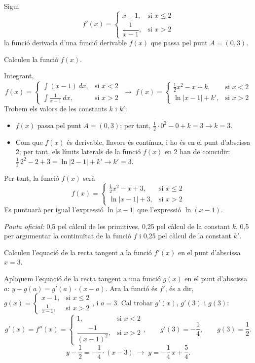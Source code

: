 Sigui
\[
f'(x)=\begin{cases}x-1,&\text{si }x\le2\\[3pt]\dfrac{1}{x-1},&\text{si }x>2\end{cases}
\]
la funció derivada d'una funció derivable $f(x)$ que passa pel punt $A=(0,3)$.

\begin{apartats}

Calculeu la funció $f(x)$.

\begin{solucio}
Integrant,
\[
f(x)=\begin{cases}\int(x-1)\,dx,&\text{si }x<2\\[3pt]\int\frac{1}{x-1}\,dx,&\text{si }x>2\end{cases}
\;\rightarrow\;
f(x)=\begin{cases}\frac12x^2-x+k,&\text{si }x<2\\[3pt]\ln|x-1|+k',&\text{si }x>2\end{cases}
\]
Trobem els valors de les constants $k$ i $k'$:
\begin{itemize}
\item $f(x)$ passa pel punt $A=(0,3)$; per tant, $\frac12\cdot0^2-0+k=3\rightarrow k=3$.
\item Com que $f(x)$ és derivable, llavors és contínua, i ho és en el punt d'abscissa 2; per tant, els límits
laterals de la funció $f(x)$ en 2 han de coincidir: $\frac12\,2^2-2+3=\ln|2-1|+k'\rightarrow k'=3$.
\end{itemize}
Per tant, la funció $f(x)$ serà
\[
\boxed{f(x)=\begin{cases}\frac12x^2-x+3,&\text{si }x\le2\\[3pt]\ln|x-1|+3,&\text{si }x>2\end{cases}}
\]
Es puntuarà per igual l'expressió $\ln|x-1|$ que l'expressió $\ln(x-1)$.

\textit{Pauta oficial:} 0,5 pel càlcul de les primitives, 0,25 pel càlcul de la constant $k$, 0,5 per argumentar la
continuïtat de la funció $f$ i 0,25 pel càlcul de la constant $k'$.
\end{solucio}

Calculeu l'equació de la recta tangent a la funció $f'(x)$ en el punt d'abscissa $x=3$.

\begin{solucio}
Apliquem l'equació de la recta tangent a una funció $g(x)$ en el punt d'abscissa $a$: $y-g(a)=g'(a)\cdot(x-a)$. Ara la
funció és $f'$, és a dir, $g(x)=\begin{cases}x-1,&\text{si }x\le2\\\frac{1}{x-1},&\text{si }x>2\end{cases}$, i $a=3$. Cal
trobar $g'(x)$, $g'(3)$ i $g(3)$:
\[
g'(x)=f''(x)=\begin{cases}1,&\text{si }x<2\\[3pt]\dfrac{-1}{(x-1)^2},&\text{si }x>2\end{cases},\qquad
g'(3)=-\frac14,\qquad g(3)=\frac12 .
\]
\[
y-\frac12=-\frac14\cdot(x-3)\;\rightarrow\;\boxed{y=-\frac14\,x+\frac54}.
\]


\end{solucio}
\end{apartats}
